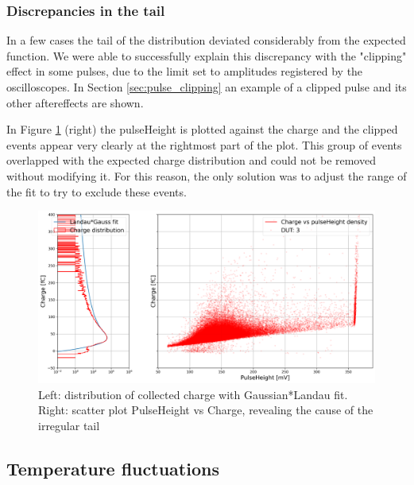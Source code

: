 \subsubsection{Discrepancies in the tail}\label{subsec:tail_discrepancies}
In a few cases the tail of the distribution deviated considerably from the expected function. We were able to successfully explain this discrepancy with the "clipping" effect in some pulses, due to the limit set to amplitudes registered by the oscilloscopes.
In Section \ref{sec:pulse_clipping} an example of a clipped pulse and its other aftereffects are shown.

In Figure \ref{fig:charge_vs_pulseHeight_for_clipping} (right) the pulseHeight is plotted against the charge and the clipped events appear very clearly at the rightmost part of the plot. This group of events overlapped with the expected charge distribution and could not be removed without modifying it. For this reason, the only solution was to adjust the range of the fit to try to exclude these events.

\begin{figure}[h!tbp]
    \centering
    \includegraphics[width=1\linewidth]{Images/charge_plots/Charge_vs_pulseHeight_density_413_S2_dut3.png}
    \captionsetup{width=\captionwidth}
    \caption{Left: distribution of collected charge with Gaussian*Landau fit. Right: scatter plot PulseHeight vs Charge, revealing the cause of the irregular tail}
    \label{fig:charge_vs_pulseHeight_for_clipping}
\end{figure}


\subsection{Temperature fluctuations}\label{sec:temperature_fluctuations}




